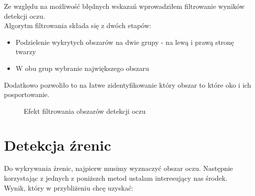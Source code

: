 \documentclass[10pt, a4paper]{article}
\begin{document}
Ze względu na możliwość błędnych wskazań wprowadziłem filtrowanie wyników detekcji oczu. \\
Algorytm filtrowania składa się z dwóch etapów:

\begin{itemize}
    \item Podzielenie wykrytych obszarów na dwie grupy - na lewą i prawą stronę twarzy
    \item W obu grup wybranie największego obszaru
\end{itemize}

Dodatkowo pozwoliło to na łatwe zidentyfikowanie który obszar to które oko i ich posportowanie.

\begin{figure}[H]
    \begin{center}
        \hspace{8mm}
    \end{center}
    \caption{Efekt filtrowania obszarów detekcji oczu}
    \label{fig:eye_filter}
\end{figure}


\section{Detekcja źrenic}

Do wykrywania źrenic, najpierw musimy wyznaczyć obszar oczu. Następnie korzystając z jednych z poniższch metod ustalam interesujący nas środek. \\
Wynik, który w przybliżeniu chcę uzyskać:
\end{document}
